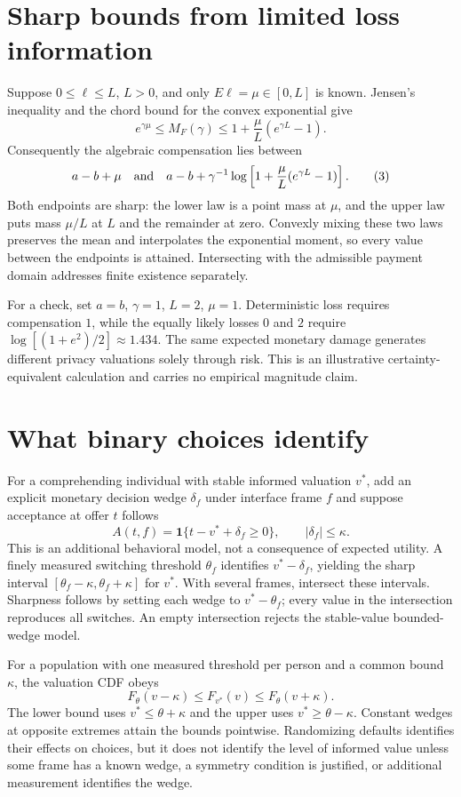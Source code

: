 \documentclass[11pt,a4paper]{article}
\newcommand{\ind}{\mathbf 1}
\begin{document}
\section{Sharp bounds from limited loss information}
Suppose $0\le\ell\le L$, $L>0$, and only $E\ell=\mu\in[0,L]$ is known. Jensen's inequality and the chord bound for the convex exponential give
\[
 e^{\gamma\mu}\le M_F(\gamma)
 \le 1+\frac\mu L(e^{\gamma L}-1).
\]
Consequently the algebraic compensation lies between
\[
 a-b+\mu
 \quad\hbox{and}\quad
 a-b+\gamma^{-1}\log\left[1+\frac\mu L(e^{\gamma L}-1)\right].
\tag{3}
\]
Both endpoints are sharp: the lower law is a point mass at $\mu$, and the upper law puts mass $\mu/L$ at $L$ and the remainder at zero. Convexly mixing these two laws preserves the mean and interpolates the exponential moment, so every value between the endpoints is attained. Intersecting with the admissible payment domain addresses finite existence separately.

For a check, set $a=b$, $\gamma=1$, $L=2$, $\mu=1$. Deterministic loss requires compensation $1$, while the equally likely losses $0$ and $2$ require $\log[(1+e^2)/2]\approx1.434$. The same expected monetary damage generates different privacy valuations solely through risk. This is an illustrative certainty-equivalent calculation and carries no empirical magnitude claim.

\section{What binary choices identify}
For a comprehending individual with stable informed valuation $v^*$, add an explicit monetary decision wedge $\delta_f$ under interface frame $f$ and suppose acceptance at offer $t$ follows
\[
 A(t,f)=\ind\{t-v^*+\delta_f\ge0\},\qquad |\delta_f|\le\kappa.
\]
This is an additional behavioral model, not a consequence of expected utility. A finely measured switching threshold $\theta_f$ identifies $v^*-\delta_f$, yielding the sharp interval
$[\theta_f-\kappa,\theta_f+\kappa]$ for $v^*$. With several frames, intersect these intervals. Sharpness follows by setting each wedge to $v^*-\theta_f$; every value in the intersection reproduces all switches. An empty intersection rejects the stable-value bounded-wedge model.

For a population with one measured threshold per person and a common bound $\kappa$, the valuation CDF obeys
\[
 F_\theta(v-\kappa)\le F_{v^*}(v)\le F_\theta(v+\kappa).
\]
The lower bound uses $v^*\le\theta+\kappa$ and the upper uses $v^*\ge\theta-\kappa$. Constant wedges at opposite extremes attain the bounds pointwise. Randomizing defaults identifies their effects on choices, but it does not identify the level of informed value unless some frame has a known wedge, a symmetry condition is justified, or additional measurement identifies the wedge.
\end{document}
